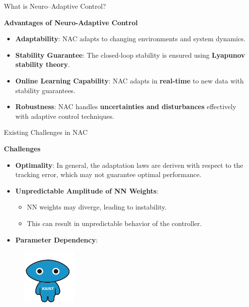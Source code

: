\documentclass[8pt, aspectratio=169]{beamer}
\begin{document}
\begin{frame}{\insertsubsectionhead}{What is Neuro–Adaptive Control?}

  \textbf{Advantages of Neuro-Adaptive Control}
  \small{
    \begin{itemize}
      \item \textbf{Adaptability}: NAC adapts to changing environments and system dynamics.
      \item \textbf{Stability Guarantee}: The closed-loop stability is ensured using \textbf{Lyapunov stability theory}.
      \item \textbf{Online Learning Capability}: NAC adapts in \textbf{real-time} to new data with stability guarantees.
      \item \textbf{Robustness}: NAC handles \textbf{uncertainties and disturbances} effectively with adaptive control techniques.
    \end{itemize}
  }
  
\end{frame}

\begin{frame}{\insertsubsectionhead}{Existing Challenges in NAC}
  
  \textbf{Challenges}
  \small{
    \begin{itemize}
      \item \textbf{Optimality}: In general, the adaptation laws are deriven with respect to the tracking error, which may not guarantee optimal performance.
      \item \textbf{Unpredictable Amplitude of NN Weights}: 
        \begin{itemize}
          \item NN weights may diverge, leading to instability.
          \item This can result in unpredictable behavior of the controller.
        \end{itemize}
      \item \textbf{Parameter Dependency}: 
    \end{itemize}
  }

  \begin{figure}
    \includegraphics[width=0.25\textwidth]{figures/KAIST-hi.png}
  \end{figure}

\end{frame}
\end{document}

